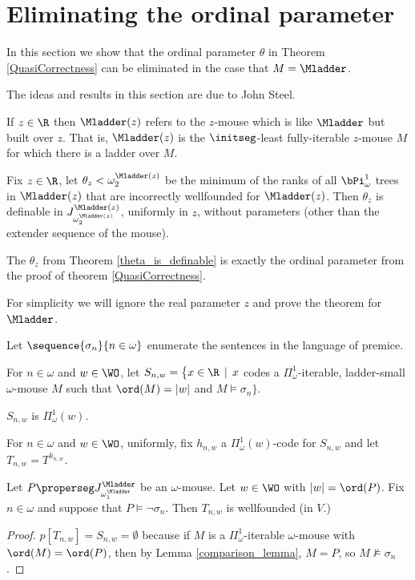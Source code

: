 \documentclass[oneside,12pt]{amsart}
\begin{document}
\section{Eliminating the ordinal parameter}
\label{section:eliminate_ordinal_parameters}

In this section we show that the ordinal parameter $\theta$ in Theorem
\ref{QuasiCorrectness} can be eliminated in the case that $M=\Mladder$.

The ideas and results in this section are due to John Steel.

\begin{definition}
If $z\in\R$ then $\Mladder(z)$ refers to the $z$-mouse which is like $\Mladder$ but built over $z$.
That is, $\Mladder(z)$ is the $\initseg$-least fully-iterable $z$-mouse $M$ for which there is
a ladder over $M$.
\end{definition}

\begin{theorem}
\label{theta_is_definable}
Fix $z\in\R$, let  $\theta_z<\omega_2^{\Mladder(z)}$ be the
minimum of the ranks of all
$\bPi^1_{\omega}$ trees in $\Mladder(z)$ that are  incorrectly wellfounded for $\Mladder(z)$.
Then $\theta_z$ is definable in $J^{\Mladder(z)}_{\omega_2^{\Mladder(z)}}$, uniformly in $z$,
without parameters (other than the extender sequence of the mouse).
\end{theorem}

The $\theta_z$ from Theorem \ref{theta_is_definable} is exactly the ordinal parameter
from the proof of theorem \ref{QuasiCorrectness}.

For simplicity we will ignore the real parameter $z$ and prove the theorem for $\Mladder$.


\begin{definition}
Let $\sequence{\sigma_n}{n\in\omega}$ enumerate the sentences in the language of premice.

For $n\in\omega$ and $w\in\WO$, let
$S_{n,w}=\big\{x\in \R \,\mid\, x$  codes a $\Pi^1_{\omega}$-iterable,
ladder-small $\omega$-mouse $M$ such that $\ord(M)=|w|$ and  $M\models\sigma_n\big\}$.

$S_{n,w}$ is $\Pi^1_{\omega}(w)$.

For $n\in\omega$ and $w\in\WO$, uniformly, fix $h_{n,w}$ a $\Pi^1_{\omega}(w)$-code for $S_{n,w}$
and let $T_{n,w}=T^{h_{n,w}}$.
\end{definition}

\begin{lemma}
\label{T_n_w_correctly_wellfounded}
Let $P\properseg J^{\Mladder}_{\omega_1^{\Mladder}}$ be an $\omega$-mouse. Let $w\in\WO$ with
$|w|=\ord(P)$. Fix $n\in\omega$
and suppose that $P\models \neg \sigma_n$. Then $T_{n,w}$ is wellfounded (in $V$.)
\end{lemma}
\begin{proof}
$p[T_{n,w}]=S_{n,w} = \emptyset$ because if $M$ is a $\Pi^1_{\omega}$-iterable $\omega$-mouse with
$\ord(M) = \ord(P)$, then by Lemma \ref{comparison_lemma}, $M=P$, so $M\not\models\sigma_n$.
\end{proof}
\end{document}
